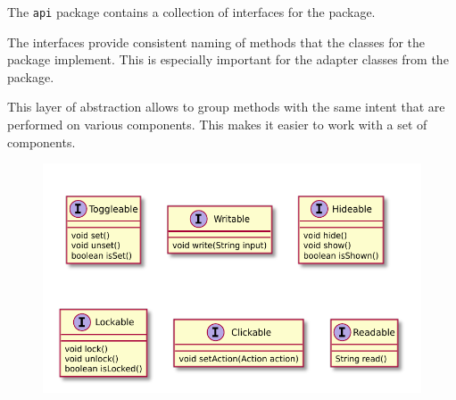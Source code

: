 The \texttt{api} package contains a collection of interfaces for the \texttt{} package.

The interfaces provide consistent naming of methods that the classes for the
\texttt{} package implement. This is especially important for
the adapter classes from the \texttt{} package.

This layer of abstraction allows to group methods with the same intent that are performed on
various components. This makes it easier to work with a set of components.

\begin{figure}[H]
	\centering
	\includegraphics[width=\textwidth]{packageDiagrams/apiPackage}
\end{figure}
